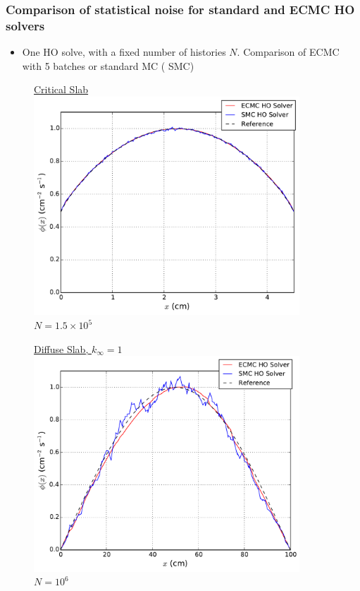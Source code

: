 \documentclass[xcolor=dvipsnames,handout]{beamer}
\newcommand{\colb}[1]{{\color{blue} #1}}
\newcommand{\colr}[1]{{\color{red} #1}}
\newlength{\wideitemsep}
\let\olditem\item
\renewcommand{\item}{\setlength{\itemsep}{\wideitemsep}\olditem}
\begin{document}
\begin{frame}
    \frametitle{Comparison of statistical noise for standard and ECMC HO solvers}
    \begin{block}{}
    \begin{itemize}
        \item One HO solve, with a fixed number of histories $N$. Comparison of
            \colr{ECMC} with 5 batches or standard MC (\colb{SMC}) 
    \end{itemize}
    \end{block}
  \begin{minipage}{0.49\textwidth}
  \begin{figure}
    \centering
    \underline{Critical Slab}
    \includegraphics[width=0.89\textwidth]{sood_smc_compare.pdf} \\
      \hspace{0.1in}$N=1.5\times10^5$
  \end{figure}
  \end{minipage}
  \begin{minipage}{0.49\textwidth}
  \begin{figure}
    \centering
    \underline{Diffuse Slab, $k_\infty=1$}
    \includegraphics[width=0.89\textwidth]{smc_compare.pdf} \\
    \hspace{0.3in}$N=10^6$
  \end{figure}
  \end{minipage}


\end{frame}
\end{document}
